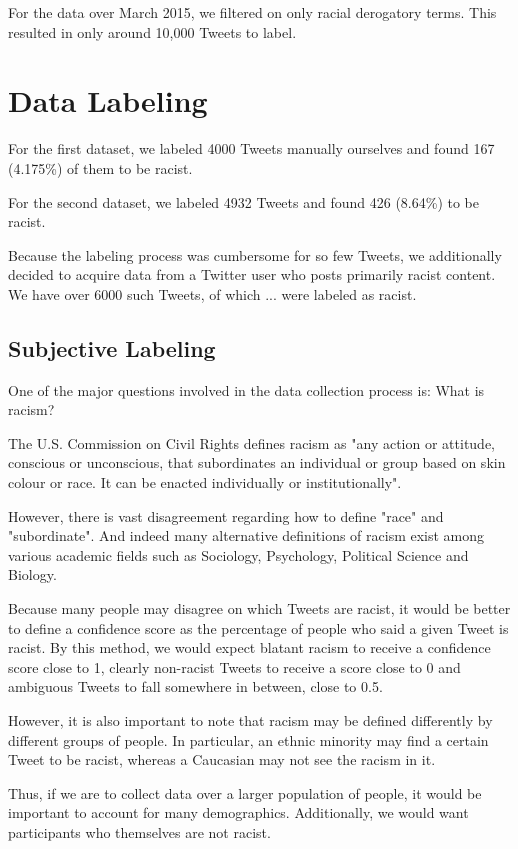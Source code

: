 \documentclass[]{article}
\begin{document}
For the data over March 2015, we filtered on only racial derogatory terms. This resulted in only around 10,000 Tweets to label.

\section{Data Labeling}

For the first dataset, we labeled 4000 Tweets manually ourselves and found 167 (4.175\%) of them to be racist.

For the second dataset, we labeled 4932 Tweets and found 426 (8.64\%) to be racist.

Because the labeling process was cumbersome for so few Tweets, we additionally decided to acquire data from a Twitter user who posts primarily racist content. We have over 6000 such Tweets, of which ... were labeled as racist.

\subsection{Subjective Labeling}

One of the major questions involved in the data collection process is: What is racism? 

The U.S. Commission on Civil Rights defines racism as "any action or attitude, conscious or unconscious, that subordinates an individual or group based on skin colour or race. It can be enacted individually or institutionally".

However, there is vast disagreement regarding how to define "race" and "subordinate". And indeed many alternative definitions of racism exist among various academic fields such as Sociology, Psychology, Political Science and Biology.

Because many people may disagree on which Tweets are racist, it would be better to define a confidence score as the percentage of people who said a given Tweet is racist. By this method, we would expect blatant racism to receive a confidence score close to 1, clearly non-racist Tweets to receive a score close to 0 and ambiguous Tweets to fall somewhere in between, close to 0.5.

However, it is also important to note that racism may be defined differently by different groups of people. In particular, an ethnic minority may find a certain Tweet to be racist, whereas a Caucasian may not see the racism in it.

Thus, if we are to collect data over a larger population of people, it would be important to account for many demographics. Additionally, we would want participants who themselves are not racist.
\end{document}
